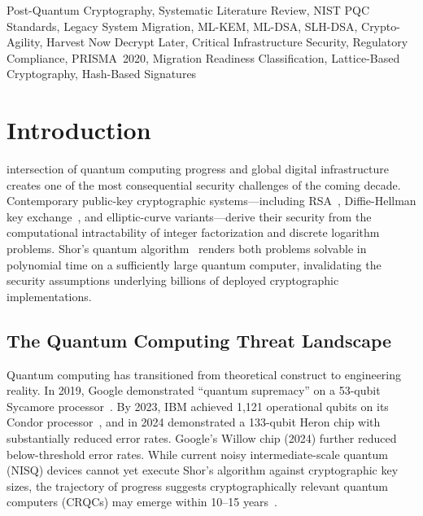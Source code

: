 \documentclass[journal]{IEEEtran}
\begin{document}
\begin{IEEEkeywords}
Post-Quantum Cryptography, Systematic Literature Review, NIST PQC Standards,
Legacy System Migration, ML-KEM, ML-DSA, SLH-DSA, Crypto-Agility, Harvest
Now Decrypt Later, Critical Infrastructure Security, Regulatory Compliance,
PRISMA~2020, Migration Readiness Classification, Lattice-Based Cryptography,
Hash-Based Signatures
\end{IEEEkeywords}

\section{Introduction}
\label{sec:intro}

 intersection of quantum computing progress and global digital
infrastructure creates one of the most consequential security challenges of the
coming decade. Contemporary public-key cryptographic systems---including RSA~\cite{rivest1978method},
Diffie-Hellman key exchange~\cite{diffie1976new}, and elliptic-curve variants---derive
their security from the computational intractability of integer factorization and
discrete logarithm problems. Shor's quantum algorithm~\cite{shor1994algorithms}
renders both problems solvable in polynomial time on a sufficiently large
quantum computer, invalidating the security assumptions underlying billions of
deployed cryptographic implementations.

\subsection{The Quantum Computing Threat Landscape}

Quantum computing has transitioned from theoretical construct to engineering
reality. In 2019, Google demonstrated ``quantum supremacy'' on a 53-qubit
Sycamore processor~\cite{arute2019quantum}. By 2023, IBM achieved 1,121
operational qubits on its Condor processor~\cite{ibm2023condor}, and in 2024
demonstrated a 133-qubit Heron chip with substantially reduced error rates.
Google's Willow chip (2024) further reduced below-threshold error rates.
While current noisy intermediate-scale quantum (NISQ) devices cannot yet
execute Shor's algorithm against cryptographic key sizes, the trajectory of
progress suggests cryptographically relevant quantum computers (CRQCs) may
emerge within 10--15 years~\cite{mosca2018cybersecurity,preskill2018quantum}.
\end{document}
